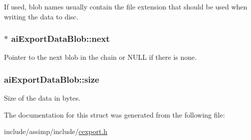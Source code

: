 If used, blob names usually contain the file extension that should be used when writing the data to disc. \hypertarget{structai_export_data_blob_a73baa3d77f95f360540b0b1922075ba5}{
\subsubsection[{next}]{$\ast$ ai\-Export\-Data\-Blob\-::next}}\label{structai_export_data_blob_a73baa3d77f95f360540b0b1922075ba5}
Pointer to the next blob in the chain or N\-U\-L\-L if there is none. \hypertarget{structai_export_data_blob_a339bfaacc70396b2f99f94c1bc3b808f}{
\subsubsection[{size}]{ ai\-Export\-Data\-Blob\-::size}}\label{structai_export_data_blob_a339bfaacc70396b2f99f94c1bc3b808f}


Size of the data in bytes. 



The documentation for this struct was generated from the following file\-:\begin{DoxyCompactItemize}
\item 
include/assimp/include/\hyperlink{cexport_8h}{cexport.\-h}\end{DoxyCompactItemize}
